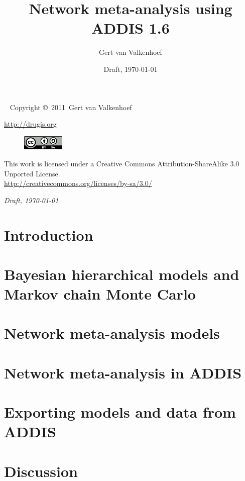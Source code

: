 \documentclass[a4paper]{report}
\title{Network meta-analysis using ADDIS 1.6}
\author{Gert van Valkenhoef}
\date{Draft, \today}
\begin{document}
\maketitle

\newpage
~\vfill
\thispagestyle{empty}
\setlength{\parindent}{0pt}
\setlength{\parskip}{\baselineskip}
Copyright \copyright\ 2011\ Gert van Valkenhoef

\par \url{http://drugis.org}

\begin{figure}
\includegraphics[width=0.18\textwidth]{by-sa}
\end{figure}
\par This work is licensed under a Creative Commons Attribution-ShareAlike 3.0 Unported License. \\
\url{http://creativecommons.org/licenses/by-sa/3.0/}

\par\textit{Draft, \today}

\tableofcontents

\chapter{Introduction}

\chapter{Bayesian hierarchical models and Markov chain Monte Carlo}

\chapter{Network meta-analysis models}

\chapter{Network meta-analysis in ADDIS}

\chapter{Exporting models and data from ADDIS}

\chapter{Discussion}
\end{document}

